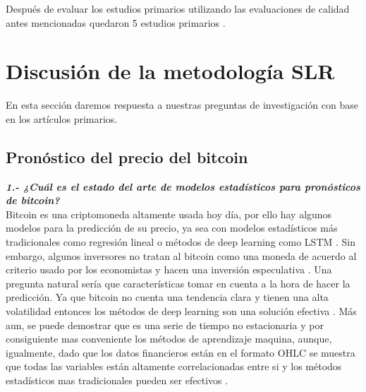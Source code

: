 Después de evaluar los estudios primarios utilizando las evaluaciones de calidad antes mencionadas quedaron 5 estudios primarios \cite{ibrahimPredictingMarketMovement2021,jaquartShorttermBitcoinMarket2021,chenBitcoinPricePrediction2020,akyildirimPredictionCryptocurrencyReturns2021,pintelasInvestigatingProblemCryptocurrency2020}.

\section{Discusión de la metodología SLR}
En esta sección daremos respuesta a nuestras preguntas de investigación con base en los artículos primarios.

\subsection{Pronóstico del precio del bitcoin}

\textbf{\textit{1.- ¿Cuál es el estado del arte de modelos estadísticos para pronósticos de bitcoin?}}\\
Bitcoin es una criptomoneda altamente usada hoy día, por ello hay algunos modelos para la predicción de su precio, ya sea con modelos estadísticos más tradicionales como regresión lineal o métodos de deep learning como LSTM \cite{tandonBitcoinPriceForecasting2019}. Sin embargo, algunos inversores no tratan al bitcoin como una moneda de acuerdo al criterio usado por los economistas y hacen una inversión especulativa \cite{chenBitcoinPricePrediction2020}. Una pregunta natural sería que características tomar en cuenta a la hora de hacer la predicción. Ya que bitcoin no cuenta una tendencia clara y tienen una alta volatilidad entonces los métodos de deep learning son una solución efectiva \cite{tandonBitcoinPriceForecasting2019}. Más aun, se puede demostrar que es una serie de tiempo no estacionaria \cite{mudassirTimeseriesForecastingBitcoin2020} y por consiguiente mas conveniente los métodos de aprendizaje maquina, aunque, igualmente, dado que los datos financieros están en el formato OHLC se muestra que todas las variables están altamente correlacionadas entre si y los métodos estadísticos mas tradicionales pueden ser efectivos \cite{phaladisailoedMachineLearningModels2018}.\\

